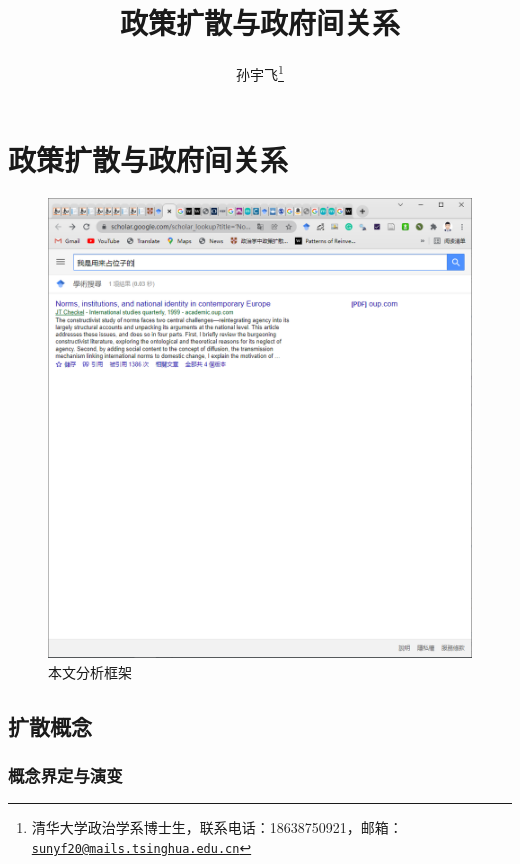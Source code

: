 \documentclass[
  12pt,
]{ctexart}
\title{政策扩散与政府间关系}
\author{孙宇飞\footnote{清华大学政治学系博士生，联系电话：18638750921，邮箱：\href{mailto:sunyf20@mails.tsinghua.edu.cn}{\nolinkurl{sunyf20@mails.tsinghua.edu.cn}}}}
\date{}
\begin{document}
\maketitle

\hypertarget{ux653fux7b56ux6269ux6563ux4e0eux653fux5e9cux95f4ux5173ux7cfb}{%
\section{政策扩散与政府间关系}\label{ux653fux7b56ux6269ux6563ux4e0eux653fux5e9cux95f4ux5173ux7cfb}}

\begin{figure}
\includegraphics[width=1\linewidth]{../figures/分析框架} \caption{本文分析框架}\label{fig:unnamed-chunk-1}
\end{figure}

\hypertarget{ux6269ux6563ux6982ux5ff5}{%
\subsection{扩散概念}\label{ux6269ux6563ux6982ux5ff5}}

\hypertarget{ux6982ux5ff5ux754cux5b9aux4e0eux6f14ux53d8}{%
\subsubsection{概念界定与演变}\label{ux6982ux5ff5ux754cux5b9aux4e0eux6f14ux53d8}}
\end{document}
